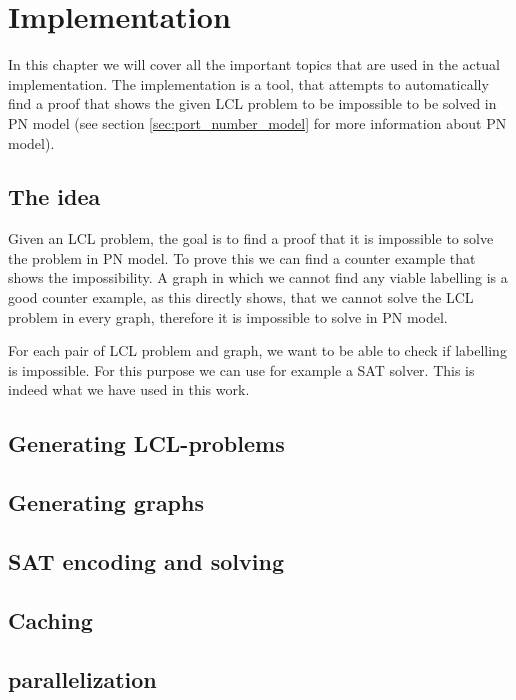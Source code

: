 

\section{Implementation} \label{sec:implementation}
In this chapter we will cover all the important topics that are used in the actual implementation.
The implementation is a tool, that attempts to automatically find a proof that shows the given LCL problem to be impossible to be solved in PN model (see section \ref{sec:port_number_model} for more information about PN model).

\subsection{The idea}
Given an LCL problem, the goal is to find a proof that it is impossible to solve the problem in PN model.
To prove this we can find a counter example that shows the impossibility.
A graph in which we cannot find any viable labelling is a good counter example, as this directly shows, that we cannot solve the LCL problem in every graph, therefore it is impossible to solve in PN model.

For each pair of LCL problem and graph, we want to be able to check if labelling is impossible.
For this purpose we can use for example a SAT solver.
This is indeed what we have used in this work.




\subsection{Generating LCL-problems}
\subsection{Generating graphs}
\subsection{SAT encoding and solving}
\subsection{Caching}

\subsection{parallelization}

